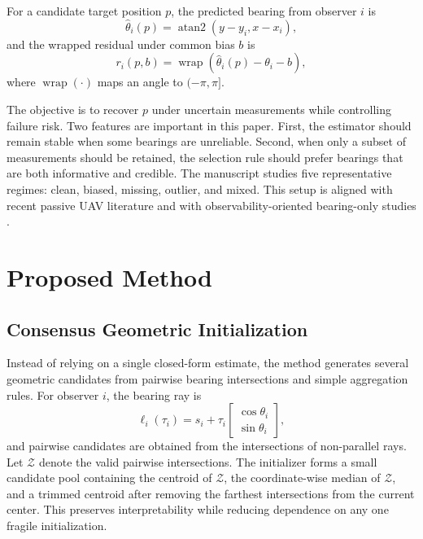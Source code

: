 \documentclass[preprint,12pt]{elsarticle}
\begin{document}
For a candidate target position $p$, the predicted bearing from observer $i$ is
\begin{equation}
\hat{\theta}_i(p)=\operatorname{atan2}(y-y_i, x-x_i),
\end{equation}
and the wrapped residual under common bias $b$ is
\begin{equation}
r_i(p,b)=\operatorname{wrap}\!\left(\hat{\theta}_i(p)-\theta_i-b\right),
\end{equation}
where $\operatorname{wrap}(\cdot)$ maps an angle to $(-\pi,\pi]$.

The objective is to recover $p$ under uncertain measurements while controlling failure risk. Two features are important in this paper. First, the estimator should remain stable when some bearings are unreliable. Second, when only a subset of measurements should be retained, the selection rule should prefer bearings that are both informative and credible. The manuscript studies five representative regimes: clean, biased, missing, outlier, and mixed. This setup is aligned with recent passive UAV literature and with observability-oriented bearing-only studies \cite{li2025bearing,wang2025bio,peng2024trajectory}.

\section{Proposed Method}

\subsection{Consensus Geometric Initialization}

Instead of relying on a single closed-form estimate, the method generates several geometric candidates from pairwise bearing intersections and simple aggregation rules. For observer $i$, the bearing ray is
\begin{equation}
\ell_i(\tau_i)=s_i+\tau_i
\begin{bmatrix}
\cos \theta_i\\
\sin \theta_i
\end{bmatrix},
\end{equation}
and pairwise candidates are obtained from the intersections of non-parallel rays. Let $\mathcal{Z}$ denote the valid pairwise intersections. The initializer forms a small candidate pool containing the centroid of $\mathcal{Z}$, the coordinate-wise median of $\mathcal{Z}$, and a trimmed centroid after removing the farthest intersections from the current center. This preserves interpretability while reducing dependence on any one fragile initialization.
\end{document}
